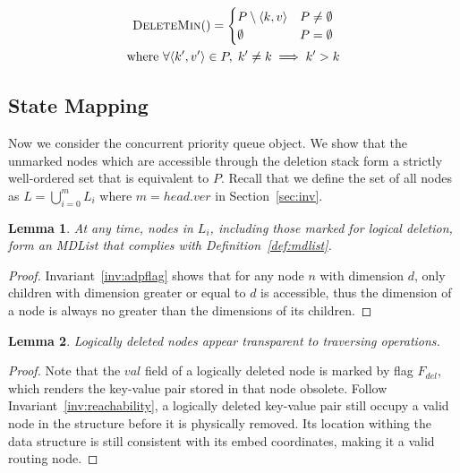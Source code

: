 \documentclass[10pt,journal,letter,compsoc]{IEEEtran}
\newtheorem{lemma}{Lemma}
\begin{document}
\begin{gather}
    \label{eq:delete1}
    \textsc{DeleteMin}()= \begin{cases}
        P \setminus {\langle k,v \rangle} & P\neq\emptyset\\
        \emptyset & P=\emptyset
    \end{cases}
    \\
    \label{eq:delete2}
    \text{where } \forall \langle k',v' \rangle \in P,\;k' \neq k \implies k' > k
\end{gather}

\subsection{State Mapping}
Now we consider the concurrent priority queue object. 
We show that the unmarked nodes which are accessible through the deletion stack form a strictly well-ordered set that is equivalent to $P$.
Recall that we define the set of all nodes as $L=\bigcup_{i=0}^{m}L_i$ where $m = head.ver$ in Section~\ref{sec:inv}.

\begin{lemma} \label{lmm:mdlist}
    At any time, nodes in $L_i$, including those marked for logical deletion, form an MDList that complies with Definition~\ref{def:mdlist}.
\end{lemma}
\begin{proof}
    Invariant~\ref{inv:adpflag} shows that for any node $n$ with dimension $d$, only children with dimension greater or equal to $d$ is accessible, thus the dimension of a node is always no greater than the dimensions of its children.
\end{proof}

\begin{lemma} \label{lmm:logical}
    Logically deleted nodes appear transparent to traversing operations.
\end{lemma}
\begin{proof}
    Note that the $val$ field of a logically deleted node is marked by flag $F_{del}$, which renders the key-value pair stored in that node obsolete.
    Follow Invariant~\ref{inv:reachability}, a logically deleted key-value pair still occupy a valid node in the structure before it is physically removed.
    Its location withing the data structure is still consistent with its embed coordinates, making it a valid routing node.
\end{proof}
\end{document}
